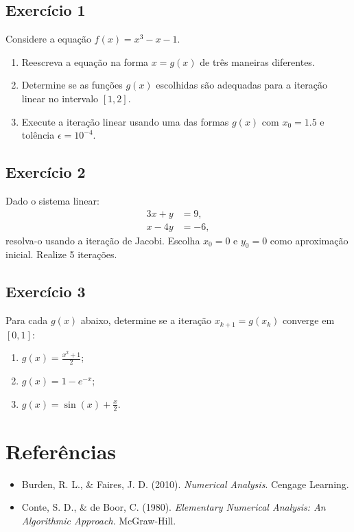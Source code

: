 \documentclass[a4paper,11pt]{article}
\begin{document}
\subsection*{Exercício 1}
Considere a equação $f(x) = x^3 - x - 1$.
\begin{enumerate}
    \item Reescreva a equação na forma $x = g(x)$ de três maneiras diferentes.
    \item Determine se as funções $g(x)$ escolhidas são adequadas para a iteração linear no intervalo $[1, 2]$.
    \item Execute a iteração linear usando uma das formas $g(x)$ com $x_0 = 1.5$ e tolência $\epsilon = 10^{-4}$.
\end{enumerate}

\subsection*{Exercício 2}
Dado o sistema linear:
\[
\begin{aligned}
3x + y &= 9, \\
x - 4y &= -6,
\end{aligned}
\]
resolva-o usando a iteração de Jacobi. Escolha $x_0 = 0$ e $y_0 = 0$ como aproximação inicial. Realize 5 iterações.

\subsection*{Exercício 3}
Para cada $g(x)$ abaixo, determine se a iteração $x_{k+1} = g(x_k)$ converge em $[0, 1]$:
\begin{enumerate}
    \item $g(x) = \frac{x^2 + 1}{2}$;
    \item $g(x) = 1 - e^{-x}$;
    \item $g(x) = \sin(x) + \frac{x}{2}$.
\end{enumerate}

\section*{Referências}
\begin{itemize}
    \item Burden, R. L., \& Faires, J. D. (2010). \textit{Numerical Analysis}. Cengage Learning.
    \item Conte, S. D., \& de Boor, C. (1980). \textit{Elementary Numerical Analysis: An Algorithmic Approach}. McGraw-Hill.
\end{itemize}
\end{document}
